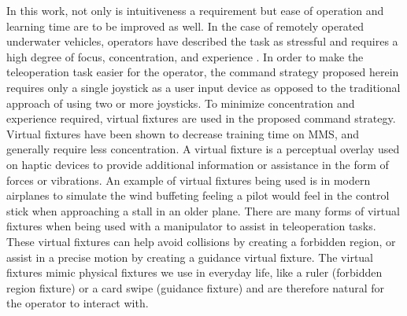 \documentclass[onecolumn,10pt,final]{asme2ej}
\begin{document}
In this work, not only is intuitiveness a requirement but ease of operation and learning time are to be improved as well. In the case of remotely operated underwater vehicles, operators have described the task as stressful and requires a high degree of focus, concentration, and experience \cite{stress}. In order to make the teleoperation task easier for the operator, the command strategy proposed herein requires only a single joystick as a user input device as opposed to the traditional approach of using two or more joysticks. To minimize concentration and experience required, virtual fixtures are used in the proposed command strategy. Virtual fixtures have been shown to decrease training time on MMS, and generally require less concentration\cite{w3}. A virtual fixture is a perceptual overlay used on haptic devices to provide additional information or assistance in the form of forces or vibrations. An example of virtual fixtures being used is in modern airplanes to simulate the wind buffeting feeling a pilot would feel in the control stick when approaching a stall in an older plane. There are many forms of virtual fixtures when being used with a manipulator to assist in teleoperation tasks. These virtual fixtures can help avoid collisions by creating a forbidden region, or assist in a precise motion by creating a guidance virtual fixture. The virtual fixtures mimic physical fixtures we use in everyday life, like a ruler (forbidden region fixture) or a card swipe (guidance fixture) and are therefore natural for the operator to interact with.\\
\end{document}
